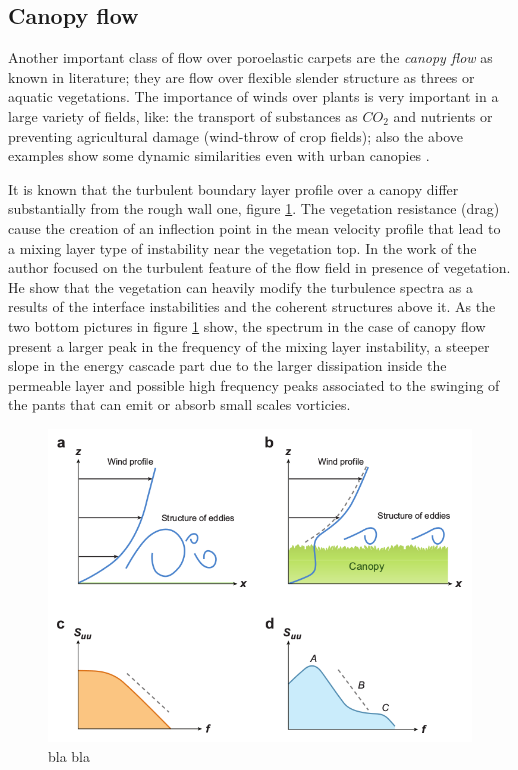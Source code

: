 \subsection{Canopy flow}

Another important class of flow over poroelastic carpets are the \textit{canopy flow} as known in literature; they are flow over flexible slender structure as threes or aquatic vegetations.
The importance of winds over plants is very important in a large variety of fields, like: the transport of substances as $CO_2$ and nutrients or preventing agricultural damage (wind-throw of crop fields); also the above examples show some dynamic similarities even with urban canopies \citet{ghisalberti2009obstructed}.

It is known that the turbulent boundary layer profile over a canopy differ substantially from the rough wall one, figure \ref{fig:spectra}.
The vegetation resistance (drag) cause the creation of an inflection point in the mean velocity profile that lead to a mixing layer type of instability near the vegetation top.
In the work of \citet{finnigan2000turbulence} the author focused on the turbulent feature of the flow field in presence of vegetation.
He show that the vegetation can heavily modify the turbulence spectra as a results of the interface instabilities and the coherent structures above it.
As the two bottom pictures in figure \ref{fig:spectra} show, the spectrum in the case of canopy flow present a larger peak in the frequency of the mixing layer instability, a steeper slope in the energy cascade part due to the larger dissipation inside the permeable layer and possible high frequency peaks associated to the swinging of the pants that can emit or absorb small scales vorticies.
 
\begin{figure}[h]
	\centering
	\includegraphics[width=0.7\linewidth]{chapter_1/spectra}
	\caption{bla bla \citet{de2008effects}}
		\label{fig:spectra}
	\end{figure}

